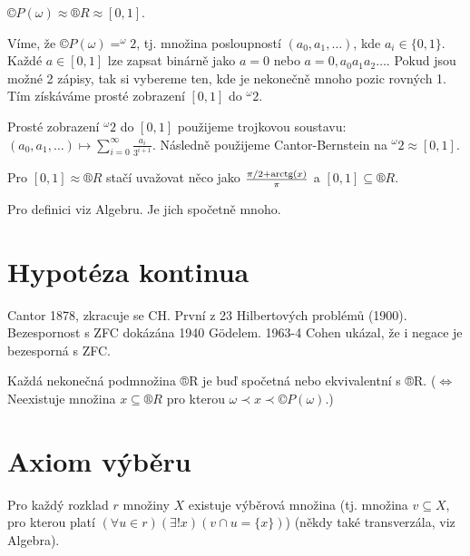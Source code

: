 \documentclass[12pt]{article}                   %
\begin{document}
    \begin{veta}
        $©P(\omega) \approx ®R \approx [0, 1]$.

        \begin{dukazin}
            Víme, že $©P(\omega) = ^\omega 2$, tj. množina posloupností $(a_0, a_1, …)$, kde $a_i \in \{0, 1\}$. Každé $a \in [0, 1]$ lze zapsat binárně jako $a = 0$ nebo $a = 0, a_0a_1a_2…$. Pokud jsou možné 2 zápisy, tak si vybereme ten, kde je nekonečně mnoho pozic rovných 1. Tím získáváme prosté zobrazení $[0, 1]$ do $^\omega 2$.

            Prosté zobrazení $^\omega 2$ do $[0,1]$ použijeme trojkovou soustavu: $(a_0, a_1, …) \mapsto \sum_{i=0}^∞ \frac{a_i}{3^{i+1}}$. Následně použijeme Cantor-Bernstein na $^\omega 2 \approx [0, 1]$.

            Pro $[0, 1] \approx ®R$ stačí uvažovat něco jako $\frac{\pi/2 + \operatorname{arctg}(x)}{\pi}$ a $[0, 1] \subseteq ®R$.
        \end{dukazin}
    \end{veta}

    \begin{poznamka}
        Pro definici viz Algebru. Je jich spočetně mnoho.
    \end{poznamka}


\section{Hypotéza kontinua}
    \begin{poznamka}[Historie]
        Cantor 1878, zkracuje se CH. První z 23 Hilbertových problémů (1900). Bezespornost s ZFC dokázána 1940 Gödelem. 1963-4 Cohen ukázal, že i negace je bezesporná s ZFC.
    \end{poznamka}

    \begin{definice}[CH]
        Každá nekonečná podmnožina ®R je buď spočetná nebo ekvivalentní s ®R. ($\Leftrightarrow$ Neexistuje množina $x \subseteq ®R$ pro kterou $\omega \prec x \prec ©P(\omega)$.)
    \end{definice}

\section{Axiom výběru}
    \begin{definice}
        Pro každý rozklad $r$ množiny $X$ existuje výběrová množina (tj. množina $v \subseteq X$, pro kterou platí $(\forall u \in r)(\exists! x)(v \cap u = \{x\})$) (někdy také transverzála, viz Algebra).
    \end{definice}
\end{document}
